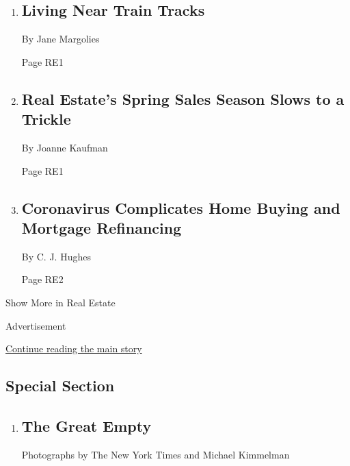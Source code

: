 \begin{enumerate}
\def\labelenumi{\arabic{enumi}.}
\item
  \href{/2020/03/27/realestate/living-near-train-tracks.html}{}

  \hypertarget{living-near-train-tracks}{%
  \subsection{Living Near Train Tracks}\label{living-near-train-tracks}}

  By Jane Margolies

  Page RE1
\item
  \href{/2020/03/24/realestate/coronavirus-real-estate-spring-sales-season.html}{}

  \hypertarget{real-estates-spring-sales-season-slows-to-a-trickle}{%
  \subsection{Real Estate's Spring Sales Season Slows to a
  Trickle}\label{real-estates-spring-sales-season-slows-to-a-trickle}}

  By Joanne Kaufman

  Page RE1
\item
  \href{/2020/03/23/realestate/coronavirus-home-buying-mortgage-refinancing.html}{}

  \hypertarget{coronavirus-complicates-home-buying-and-mortgage-refinancing}{%
  \subsection{Coronavirus Complicates Home Buying and Mortgage
  Refinancing}\label{coronavirus-complicates-home-buying-and-mortgage-refinancing}}

  By C. J. Hughes

  Page RE2
\end{enumerate}

Show More in Real Estate

Advertisement

\protect\hyperlink{after-mid8}{Continue reading the main story}

\hypertarget{special-section}{%
\subsection{Special Section}\label{special-section}}

\begin{enumerate}
\def\labelenumi{\arabic{enumi}.}
\item
  \href{/interactive/2020/03/23/world/coronavirus-great-empty.html}{}

  \hypertarget{the-great-empty-1}{%
  \subsection{The Great Empty}\label{the-great-empty-1}}

  Photographs by The New York Times and Michael Kimmelman
\end{enumerate}

